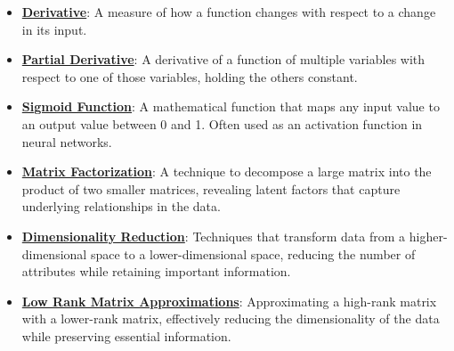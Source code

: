 \documentclass{article}%
\begin{document}
\begin{itemize}[leftmargin=*]
\item \href{https://purdue.brightspace.com/d2l/common/assets/pdfjs-d2l-dist/1.0.14-legacy/web/viewer.html?file=%2Fcontent%2Fenforced%2F1095467-wl.202510.CS.24300.001%2F04L1-Linear Algebra Primer.pdf%3Fou%3D1095467&lang=en-us&container=d2l-fileviewer-rendered-pdf&fullscreen=d2l-fileviewer-rendered-pdf-dialog&height=667#page=21}{\textbf{Derivative}}: A measure of how a function changes with respect to a change in its input.%
\item \href{https://purdue.brightspace.com/d2l/common/assets/pdfjs-d2l-dist/1.0.14-legacy/web/viewer.html?file=%2Fcontent%2Fenforced%2F1095467-wl.202510.CS.24300.001%2F04L1-Linear Algebra Primer.pdf%3Fou%3D1095467&lang=en-us&container=d2l-fileviewer-rendered-pdf&fullscreen=d2l-fileviewer-rendered-pdf-dialog&height=667#page=19}{\textbf{Partial Derivative}}: A derivative of a function of multiple variables with respect to one of those variables, holding the others constant.%
\item \href{https://purdue.brightspace.com/d2l/common/assets/pdfjs-d2l-dist/1.0.14-legacy/web/viewer.html?file=%2Fcontent%2Fenforced%2F1095467-wl.202510.CS.24300.001%2F04L1-Linear Algebra Primer.pdf%3Fou%3D1095467&lang=en-us&container=d2l-fileviewer-rendered-pdf&fullscreen=d2l-fileviewer-rendered-pdf-dialog&height=667#page=21}{\textbf{Sigmoid Function}}: A mathematical function that maps any input value to an output value between 0 and 1. Often used as an activation function in neural networks.%
\item \href{https://purdue.brightspace.com/d2l/common/assets/pdfjs-d2l-dist/1.0.14-legacy/web/viewer.html?file=%2Fcontent%2Fenforced%2F1095467-wl.202510.CS.24300.001%2F11L2-svd-pca-recommender.pdf%3Fou%3D1095467&lang=en-us&container=d2l-fileviewer-rendered-pdf&fullscreen=d2l-fileviewer-rendered-pdf-dialog&height=667#page=2}{\textbf{Matrix Factorization}}: A technique to decompose a large matrix into the product of two smaller matrices, revealing latent factors that capture underlying relationships in the data.%
\item \href{https://purdue.brightspace.com/d2l/common/assets/pdfjs-d2l-dist/1.0.14-legacy/web/viewer.html?file=%2Fcontent%2Fenforced%2F1095467-wl.202510.CS.24300.001%2F11L2-svd-pca-recommender.pdf%3Fou%3D1095467&lang=en-us&container=d2l-fileviewer-rendered-pdf&fullscreen=d2l-fileviewer-rendered-pdf-dialog&height=667#page=8}{\textbf{Dimensionality Reduction}}: Techniques that transform data from a higher-dimensional space to a lower-dimensional space, reducing the number of attributes while retaining important information.%
\item \href{https://purdue.brightspace.com/d2l/common/assets/pdfjs-d2l-dist/1.0.14-legacy/web/viewer.html?file=%2Fcontent%2Fenforced%2F1095467-wl.202510.CS.24300.001%2F11L2-svd-pca-recommender.pdf%3Fou%3D1095467&lang=en-us&container=d2l-fileviewer-rendered-pdf&fullscreen=d2l-fileviewer-rendered-pdf-dialog&height=667#page=9}{\textbf{Low Rank Matrix Approximations}}: Approximating a high-rank matrix with a lower-rank matrix, effectively reducing the dimensionality of the data while preserving essential information.%
\end{itemize}
\end{document}
